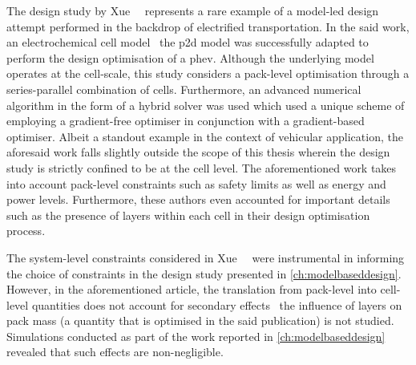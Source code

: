 

The  design   study  by  Xue~\etal~\cite{Xue2014}  represents   a  rare  example
of  a  model-led  design  attempt  performed  in  the  backdrop  of  electrified
transportation.  In  the  said  work, an  electrochemical  cell  model  \viz~the
\gls{p2d} model was successfully adapted to perform the design optimisation of a
\gls{phev}. Although the underlying model operates at the cell-scale, this study
considers  a pack-level  optimisation through  a series-parallel  combination of
cells. Furthermore,  an advanced  numerical algorithm  in the  form of  a hybrid
solver  was  used which  used  a  unique  scheme  of employing  a  gradient-free
optimiser  in conjunction  with a  gradient-based optimiser.  Albeit a  standout
example  in the  context  of  vehicular application,  the  aforesaid work  falls
slightly outside the  scope of this thesis wherein the  design study is strictly
confined to  be at the  cell level. The  aforementioned work takes  into account
pack-level constraints such as safety limits as well as energy and power levels.
Furthermore,  these authors  even accounted  for important  details such  as the
presence of layers within each cell in their design optimisation process.

The  system-level   constraints  considered  in   Xue~\etal~\cite{Xue2014}  were
instrumental  in  informing  the  choice  of constraints  in  the  design  study
presented in \cref{ch:modelbaseddesign}. However, in the aforementioned article,
the translation from pack-level into  cell-level quantities does not account for
secondary effects \ie~the  influence of layers on pack mass  (a quantity that is
optimised in the said publication) is not studied. Simulations conducted as part
of the  work reported in  \cref{ch:modelbaseddesign} revealed that  such effects
are non-negligible.


